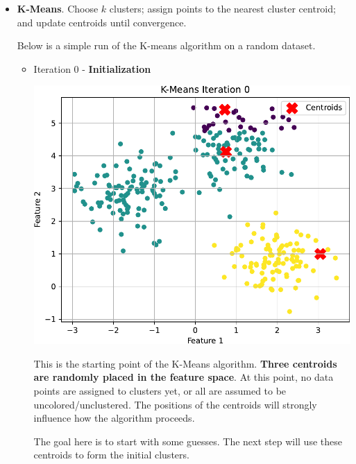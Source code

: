 \begin{itemize}
    \item \textbf{K-Means}. Choose $k$ clusters; assign points to the nearest cluster centroid; and update centroids until convergence.
    \begin{examplebox}
        Below is a simple run of the K-means algorithm on a random dataset.
        \begin{itemize}
            \item Iteration 0 - \textbf{Initialization}
            \begin{center}
                \includegraphics[width=.8\textwidth]{img/k-means/iter_0.pdf}
            \end{center}
            This is the starting point of the K-Means algorithm. \textbf{Three centroids are randomly placed in the feature space}. At this point, no data points are assigned to clusters yet, or all are assumed to be uncolored/unclustered. The positions of the centroids will strongly influence how the algorithm proceeds.

            The goal here is to start with some guesses. The next step will use these centroids to form the initial clusters.



\end{itemize}
\end{examplebox}
\end{itemize}
